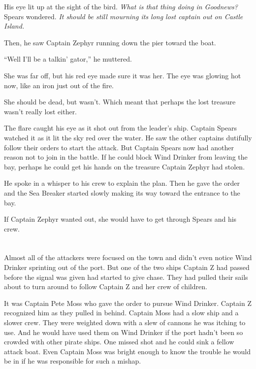 \documentclass[12pt]{extbook}
\begin{document}
  His eye lit up at the sight of the bird. \emph{What is that thing doing
  in Goodnews?} Spears wondered. \emph{It should be still mourning its
  long lost captain out on Castle Island.}
  
  Then, he saw Captain Zephyr running down the pier toward the boat.
  
  \enquote{Well I'll be a talkin' gator,} he muttered.
  
  She was far off, but his red eye made sure it was her. The eye was
  glowing hot now, like an iron just out of the fire.
  
  She should be dead, but wasn't. Which meant that perhaps the lost
  treasure wasn't really lost either.
  
  The flare caught his eye as it shot out from the leader's ship. Captain
  Spears watched it as it lit the sky red over the water. He saw the other
  captains dutifully follow their orders to start the attack. But Captain
  Spears now had another reason not to join in the battle. If he could
  block Wind Drinker from leaving the bay, perhaps he could get his hands
  on the treasure Captain Zephyr had stolen.
  
  He spoke in a whisper to his crew to explain the plan. Then he gave the
  order and the Sea Breaker started slowly making its way toward the
  entrance to the bay.
  
  If Captain Zephyr wanted out, she would have to get through Spears and
  his crew.
  
  \section{}\label{section-40}
  
  Almost all of the attackers were focused on the town and didn't even
  notice Wind Drinker sprinting out of the port. But one of the two ships
  Captain Z had passed before the signal was given had started to give
  chase. They had pulled their sails about to turn around to follow
  Captain Z and her crew of children.
  
  It was Captain Pete Moss who gave the order to pursue Wind Drinker.
  Captain Z recognized him as they pulled in behind. Captain Moss had a
  slow ship and a slower crew. They were weighted down with a slew of
  cannons he was itching to use. And he would have used them on Wind
  Drinker if the port hadn't been so crowded with other pirate ships. One
  missed shot and he could sink a fellow attack boat. Even Captain Moss
  was bright enough to know the trouble he would be in if he was
  responsible for such a mishap.
  
\end{document}
